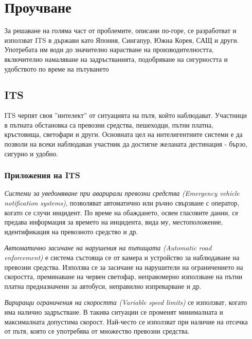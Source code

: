 \section{Проучване}

	За решаване на голяма част от проблемите, описани по-горе, се разработват и
	използват \ac{ITS} в държави като Япония, Сингапур, Южна Корея, САЩ и други.
	Употребата им води до значително нарастване на производителността, включително
	намаляване на задръстванията, подобряване на сигурността и удобството
	по време на пътуването \cite{Ezell}
	
	\subsection{\ac{ITS}}
	
	\ac{ITS} черпят своя ''интелект'' от ситуацията на пътя, който наблюдават. Участници в пътната
	обстановка са превозни средства, пешеходци, пътни платна, кръстовища, светофари и други.
	Основната цел на интелигентните системи е да позволи на всеки наблюдаван участник да
	достигне желаната дестинация - бързо, сигурно и удобно.
	
		\subsubsection{Приложения на \ac{ITS}}
		
			\emph{Системи за уведомяване при аварирали превозни средства (Emergency vehicle notification systems)},
			позволяват автоматично или ръчно свързване с оператор, когато се случи инцидент. По време
			на обаждането, освен гласовите данни, се предава информация за времето на инцидента, вида му,
			местоположение, идентификация на превозното средство и др.
			
	    \emph{Автоматично засичане на нарушения на пътищата (Automatic road enforcement)} е система състояща
	    се от камера и устройство за наблюдаване на превозни средства. Използва се за засичане
	    на нарушители на ограничението на скоростта, преминаване на червен светофар, неправомерно
	    използване на пътни платна предназначени за автобуси, неправилно изпреварване и др.
	    
	    \emph{Вариращи ограничения на скоростта (Variable speed limits)} се използват, когато
	    има налично задръстване. В такива ситуации се променят минималната и максималната допустима скорост.
	    Най-често се използват при наличие на отсечка от пътя, която се употребява от множество превозни средства.
	    
